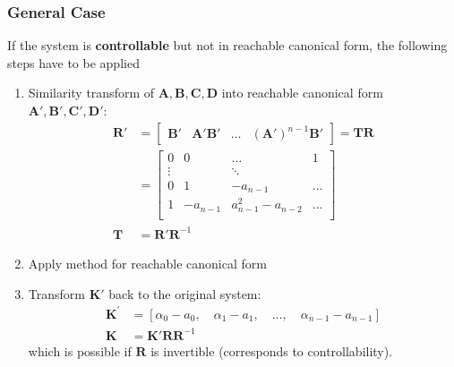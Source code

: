 \subsubsection{General Case}
If the system is \textbf{controllable} but not in reachable canonical form, the following steps have to be applied
\begin{enumerate}
    \item Similarity transform of $\mathbf{A,B,C,D}$ into reachable canonical form $\mathbf{A',B',C',D'}$:
          \noindent\begin{align*}
              \mathbf{R}' & =\begin{bmatrix}
                                 \mathbf{B}' & \mathbf{A}'\mathbf{B}' & \ldots & {(\mathbf{A}')}^{n-1}\mathbf{B}'
                             \end{bmatrix}
              =\mathbf{TR}                                                                                                \\
                          & =\begin{bmatrix}
                                 0      & 0        & \dots               & 1     \\
                                 \vdots &          & \ddots              &       \\
                                 0      & 1        & -a_{n-1}            & \dots \\
                                 1      & -a_{n-1} & a_{n-1}^2 - a_{n-2} & \dots \\
                             \end{bmatrix}                                              \\
              \mathbf{T}  & = \mathbf{R'R}^{-1}
          \end{align*}
    \item Apply method for reachable canonical form
    \item Transform $\mathbf{K}'$ back to the original system:
          \noindent\begin{align*}
              \mathbf{K}^{\prime} & =\left[\alpha_{0}-a_{0},\quad\alpha_{1}-a_{1},\quad\ldots,\quad\alpha_{n-1}-a_{n-1}\right] \\
              \mathbf{K}          & = \mathbf{K'RR}^{-1}
          \end{align*}
          which is possible if $\mathbf{R}$ is invertible (corresponds to controllability).
\end{enumerate}
